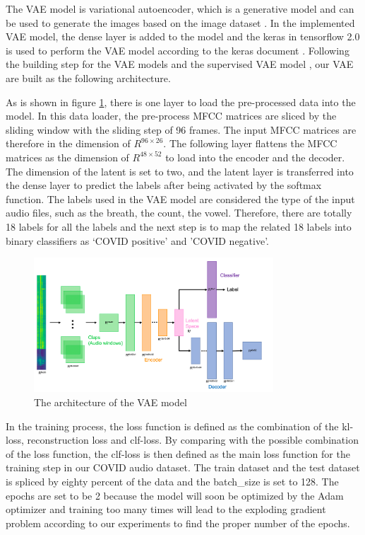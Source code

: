 \documentclass[11pt]{article}
\begin{document}
The VAE model is variational autoencoder, which is a generative model and can be used to generate the images based on the image dataset \cite{doersch2016tutorial}. In the implemented VAE model, the dense layer is added to the model \cite{ji2020multi} and the keras in tensorflow 2.0 is used to perform the VAE model according to the keras document \cite{kerasVAE}. Following the building step for the VAE models \cite{mediumVAE} and the supervised VAE model \cite{linkedinVAE}, our VAE are built as the following architecture.

As is shown in figure \ref{fig:vae_diagram}, there is one layer to load the pre-processed data into the model. In this data loader, the pre-process MFCC matrices are sliced by the sliding window with the sliding step of 96 frames. The input MFCC matrices are therefore in the dimension of $R^{96\times26}$. The following layer flattens the MFCC matrices as the dimension of $R^{48\times52}$ to load into the encoder and the decoder. The dimension of the latent is set to two, and the latent layer is transferred into the dense layer to predict the labels after being activated by the softmax function. The labels used in the VAE model are considered the type of the input audio files, such as the breath, the count, the vowel. Therefore, there are totally 18 labels for all the labels and the next step is to map the related 18 labels into binary classifiers as ‘COVID positive’ and ’COVID negative’.

\begin{figure}[htbp]{}
	\centering
    \includegraphics[width=0.8\textwidth]{./imgs/vaeDiagram.png} %
    \caption{The architecture of the VAE model}
    \label{fig:vae_diagram}
\end{figure}

In the training process, the loss function is defined as the combination of the kl-loss, reconstruction loss and clf-loss. By comparing with the possible combination of the loss function, the clf-loss is then defined as the main loss function for the training step in our COVID audio dataset. The train dataset and the test dataset is spliced by eighty percent of the data and the batch\_size is set to 128. The epochs are set to be 2 because the model will soon be optimized by the Adam optimizer and training too many times will lead to the exploding gradient problem according to our experiments to find the proper number of the epochs.
 
\end{document}
